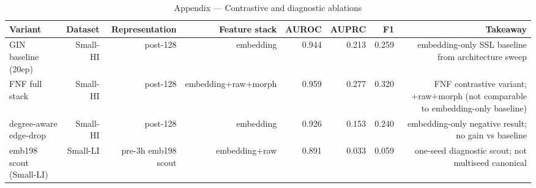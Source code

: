 \begin{table}[t]
\centering
\caption{Appendix — Contrastive and diagnostic ablations}
\begin{tabular}{lrrrrrrr}
\toprule
Variant & Dataset & Representation & Feature stack & AUROC & AUPRC & F1 & Takeaway \\
\midrule
GIN baseline (20ep) & Small-HI & post-128 & embedding & 0.944 & 0.213 & 0.259 & embedding-only SSL baseline from architecture sweep \\
FNF full stack & Small-HI & post-128 & embedding+raw+morph & 0.959 & 0.277 & 0.320 & FNF contrastive variant; +raw+morph (not comparable to embedding-only baseline) \\
degree-aware edge-drop & Small-HI & post-128 & embedding & 0.926 & 0.153 & 0.240 & embedding-only negative result; no gain vs baseline \\
emb198 scout (Small-LI) & Small-LI & pre-3h emb198 scout & embedding+raw & 0.891 & 0.033 & 0.059 & one-seed diagnostic scout; not multiseed canonical \\
\bottomrule
\end{tabular}
\end{table}
